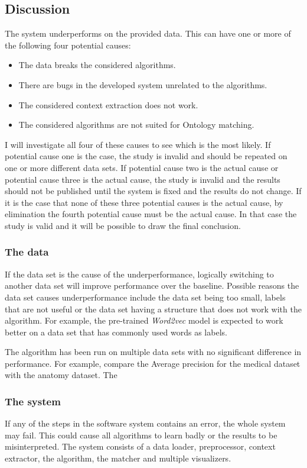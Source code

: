 \documentclass{article}
\begin{document}
 \subsection{Discussion}
  The system underperforms on the provided data. This can have one or more of the following four potential causes:
  \begin{itemize}
  \item The data breaks the considered algorithms.
  \item There are bugs in the developed system unrelated to the algorithms.
  \item The considered context extraction does not work.
  \item The considered algorithms are not suited for Ontology matching.
  \end{itemize}
  
  I will investigate all four of these causes to see which is the most likely. If potential cause one is the case, the study is invalid and should be repeated on one or more different data sets. If potential cause two is the actual cause or potential cause three is the actual cause, the study is invalid and the results should not be published until the system is fixed and the results do not change. If it is the case that none of these three potential causes is the actual cause, by elimination the fourth potential cause must be the actual cause. In that case the study is valid and it will be possible to draw the final conclusion.
  
  \subsubsection{The data}
  If the data set is the cause of the underperformance, logically switching to another data set will improve performance over the baseline. Possible reasons the data set causes underperformance include the data set being too small, labels that are not useful or the data set having a structure that does not work with the algorithm. For example, the pre-trained \emph{Word2vec} model is expected to work better on a data set that has commonly used words as labels. %
  
 The algorithm has been run on multiple data sets with no significant difference in performance. For example, compare the Average precision for the medical dataset with the anatomy dataset. The %
  \subsubsection{The system}
  If any of the steps in the software system contains an error, the whole system may fail. This could cause all algorithms to learn badly or the results to be misinterpreted. The system consists of a data loader, preprocessor, context extractor, the algorithm, the matcher and multiple visualizers. 
  
\end{document}
